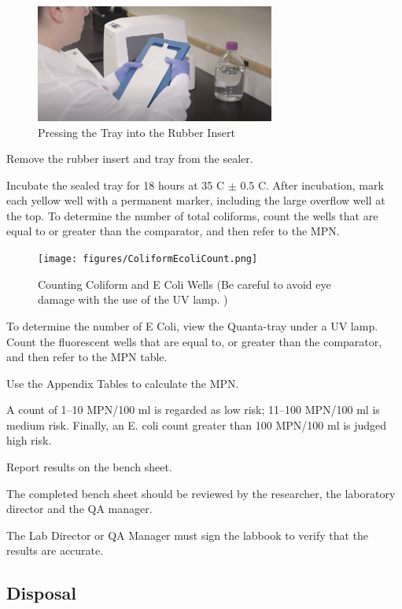 \documentclass[12pt]{../SOP4_alpha}\usepackage[]{graphicx}\usepackage[]{xcolor}
\begin{document}
\begin{figure}[h]
\includegraphics[width=0.7\textwidth]{figures/RubberInsert.png}
\caption{Pressing the Tray into the Rubber Insert}
\end{figure}

\NP Remove the rubber insert and tray from the sealer.

\NP Incubate the sealed tray for 18 hours at 35 \degree C $\pm$ 0.5 \degree C.
\NP After incubation, mark each yellow well with a permanent marker, including the large overflow well at the top. To determine the number of total coliforms, count the wells that are equal to or greater than the comparator, and then refer to the MPN.

\begin{figure}[h]
\centering
\texttt{[image: figures/ColiformEcoliCount.png]}
\caption{Counting Coliform and E Coli Wells (Be careful to avoid eye damage with  the use of the UV lamp.  )}
\end{figure}

\NP To determine the number of E Coli, view the Quanta-tray under a UV lamp. Count the fluorescent wells that are equal to, or greater than the comparator, and then refer to the MPN table.


\NP Use the Appendix Tables to calculate the MPN. 

\NP A count of 1–10 MPN/100 ml is regarded as low risk; 11--100 MPN/100 ml is medium risk. Finally, an E. coli count greater than 100 MPN/100 ml is judged high risk.


\NP Report results on the bench sheet.

\NP The completed bench sheet should be reviewed by the researcher, the
laboratory director and the QA manager. 

\NP The Lab Director or QA Manager must sign the labbook to verify that the results are accurate. 

\subsection{Disposal}
\end{document}
